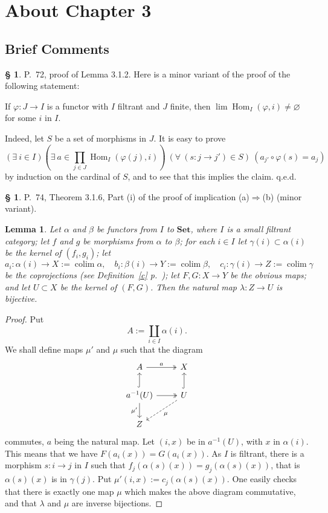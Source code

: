 \documentclass[12pt]{article}%
\newtheorem{lem}[thm]{Lemma}
\theoremstyle{remark}
\theoremstyle{definition}
\newtheorem{s}[thm]{\S}%
\newcommand{\Set}{\mathbf{Set}}
\newcommand{\then}{\Rightarrow}
\DeclareMathOperator*{\colim}{colim}
\DeclareMathOperator{\Hom}{Hom}%
\begin{document}

\section{About Chapter 3}

\subsection{Brief Comments}

\begin{s} 
P.~72, proof of Lemma 3.1.2. Here is a minor variant of the proof of the following statement: 

If $\varphi:J\to I$ is a functor with $I$ filtrant and $J$ finite, then $\lim\Hom_I(\varphi,i)\neq\varnothing$ for some $i$ in $I$. 

Indeed, let $S$ be a set of morphisms in $J$. It is easy to prove 
$$
(\exists\ i\in I)\left(\exists\ a\in\prod_{j\in J}\Hom_I(\varphi(j),i)\right)\ (\forall\ (s:j\to j')\in S)\ (a_{j'}\circ\varphi(s)=a_j) 
$$ 
by induction on the cardinal of $S$, and to see that this implies the claim. q.e.d.
\end{s}

%

\begin{s} 
P.~74, Theorem 3.1.6, Part (i) of the proof of implication (a)$\then$(b) (minor variant). 
%
\begin{lem} 
Let $\alpha$ and $\beta$ be functors from $I$ to $\Set$, where $I$ is a small filtrant category; let $f$ and $g$ be morphisms from $\alpha$ to $\beta$; for each $i\in I$ let $\gamma(i)\subset\alpha(i)$ be the kernel of $(f_i,g_i)$; let 
$$
a_i:\alpha(i)\to X:=\colim\alpha,\quad 
b_i:\beta(i)\to Y:=\colim\beta,\quad 
c_i:\gamma(i)\to Z:=\colim\gamma
$$ 
be the coprojections (see Definition~\ref{c} p.~\pageref{c}); let $F,G:X\to Y$ be the obvious maps; and let $U\subset X$ be the kernel of $(F,G)$. Then the natural map $\lambda:Z\to U$ is bijective.
\end{lem}
%
\begin{proof}
Put 
$$
A:=\coprod_{i\in I}\alpha(i).
$$
We shall define maps $\mu'$ and $\mu$ such that the diagram
$$
\begin{tikzcd}
A\ar[two heads]{r}{a}&X\\ 
a^{-1}(U)\ar[hook]{u}\ar{d}[swap]{\mu'}\ar[two heads]{r}&U\ar[hook]{u}\ar[dashed]{dl}{\mu}\\ 
Z
\end{tikzcd}
$$ 
commutes, $a$ being the natural map. Let $(i,x)$ be in $a^{-1}(U)$, with $x$ in $\alpha(i)$. This means that we have $F(a_i(x))=G(a_i(x))$. As $I$ is filtrant, there is a morphism $s:i\to j$ in $I$ such that $f_j(\alpha(s)(x))=g_j(\alpha(s)(x))$, that is $\alpha(s)(x)$ is in $\gamma(j)$. Put $\mu'(i,x):=c_j(\alpha(s)(x))$. One easily checks that there is exactly one map $\mu$ which makes the above diagram commutative, and that $\lambda$ and $\mu$ are inverse bijections.
\end{proof}
\end{s}
\end{document}
